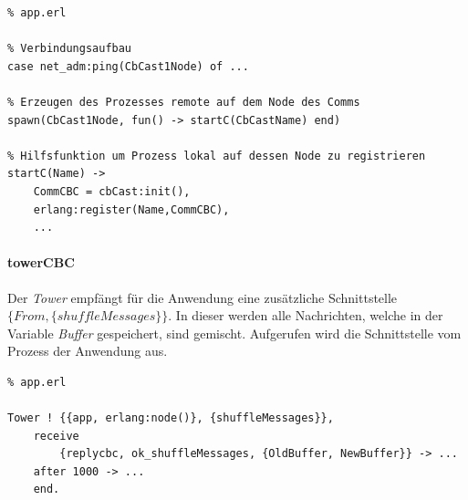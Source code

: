 \begin{lstlisting}
% app.erl 

% Verbindungsaufbau
case net_adm:ping(CbCast1Node) of ...

% Erzeugen des Prozesses remote auf dem Node des Comms
spawn(CbCast1Node, fun() -> startC(CbCastName) end)

% Hilfsfunktion um Prozess lokal auf dessen Node zu registrieren
startC(Name) ->
    CommCBC = cbCast:init(),
    erlang:register(Name,CommCBC),
    ...
\end{lstlisting}

\paragraph{towerCBC}

Der \textit{Tower} empfängt für die Anwendung eine zusätzliche Schnittstelle \\$\{From, \{shuffleMessages\}\}$. In dieser werden alle Nachrichten, welche in der Variable \textit{Buffer} gespeichert, sind gemischt. Aufgerufen wird die Schnittstelle vom Prozess der Anwendung aus.

\begin{lstlisting}
% app.erl

Tower ! {{app, erlang:node()}, {shuffleMessages}},
    receive
        {replycbc, ok_shuffleMessages, {OldBuffer, NewBuffer}} -> ...
    after 1000 -> ...
    end.
\end{lstlisting}